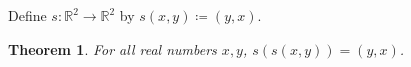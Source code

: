 \documentclass{article}
\newtheorem{theorem}{Theorem}
\begin{document}
Define $s:\mathbb{R}^2\to\mathbb{R}^2$ by $s(x,y)\coloneqq(y,x)$.
\begin{theorem}\label{thm:heldout}
For all real numbers $x,y$, $s(s(x,y))=(y,x)$.
\end{theorem}
\end{document}
